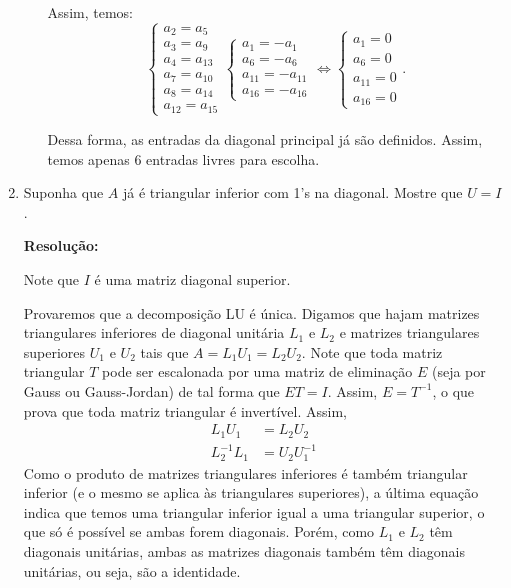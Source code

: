\documentclass[leqno]{article}
\begin{document}
\begin{enumerate}
\begin{enumerate}
        Assim, temos:
        $$\begin{cases}a_2=a_5\\a_3=a_9\\a_4=a_{13}\\a_7=a_{10}\\a_8=a_{14}\\a_{12}=a_{15}\end{cases}\begin{cases}a_1=-a_1\\a_6=-a_6\\a_{11}=-a_{11}\\a_{16}=-a_{16}\end{cases}\iff\begin{cases}a_1=0\\a_6=0\\a_{11}=0\\a_{16}=0\end{cases}\text{.}$$
        
        Dessa forma, as entradas da diagonal principal já são definidos. Assim, temos apenas 6 entradas livres para escolha.
        
    \end{enumerate}
    
    \item Suponha que $A$ já é triangular inferior com 1's na diagonal. Mostre que $U=I$.
    
    \textbf{Resolução:}
    
    Note que $I$ é uma matriz diagonal superior.
    
    Provaremos que a decomposição LU é única. Digamos que hajam matrizes triangulares inferiores de diagonal unitária $L_1$ e $L_2$ e matrizes triangulares superiores $U_1$ e $U_2$ tais que $A=L_1U_1=L_2U_2$. Note que toda matriz triangular $T$ pode ser escalonada por uma matriz de eliminação $E$ (seja por Gauss ou Gauss-Jordan) de tal forma que $ET=I$. Assim, $E=T^{-1}$, o que prova que toda matriz triangular é invertível. Assim,
    \begin{align*}
        L_1U_1&=L_2U_2\\
        L_2^{-1}L_1&=U_2U_1^{-1}
    \end{align*}
    Como o produto de matrizes triangulares inferiores é também triangular inferior (e o mesmo se aplica às triangulares superiores), a última equação indica que temos uma triangular inferior igual a uma triangular superior, o que só é possível se ambas forem diagonais. Porém, como $L_1$ e $L_2$ têm diagonais unitárias, ambas as matrizes diagonais também têm diagonais unitárias, ou seja, são a identidade.
    

\end{enumerate}
\end{document}
